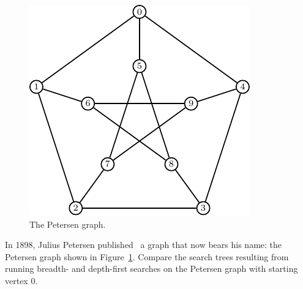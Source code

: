 \begin{figure}[!htbp]
\centering
{}
\includegraphics{image/graph-algorithms/Petersen-graph}
\caption{The Petersen graph.}
\label{fig:graph_algorithms:Petersen_graph}
\end{figure}

\begin{example}
In 1898, Julius Petersen
published~\cite{Petersen1898} a graph that now bears his name: the
Petersen graph shown in
Figure~\ref{fig:graph_algorithms:Petersen_graph}. Compare the search
trees resulting from running breadth- and
depth-first searches on the Petersen
graph with starting vertex $0$.
\end{example}

